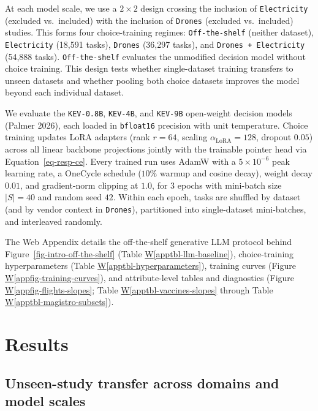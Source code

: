 \documentclass[
  11pt,
  letterpaper,
]{article}
\newcommand*\quartoapptblref[1]{Table \hyperref[#1]{W\ref{#1}}}
\newcommand*\quartoappfigref[1]{Figure \hyperref[#1]{W\ref{#1}}}
\begin{document}
At each model scale, we use a \(2 \times 2\) design crossing the
inclusion of \texttt{Electricity} (excluded vs.~included) with the
inclusion of \texttt{Drones} (excluded vs.~included) studies. This forms
four choice-training regimes: \texttt{Off-the-shelf} (neither dataset),
\texttt{Electricity} (18,591 tasks), \texttt{Drones} (36,297 tasks), and
\texttt{Drones\ +\ Electricity} (54,888 tasks). \texttt{Off-the-shelf}
evaluates the unmodified decision model without choice training. This
design tests whether single-dataset training transfers to unseen
datasets and whether pooling both choice datasets improves the model
beyond each individual dataset.

We evaluate the \texttt{KEV-0.8B}, \texttt{KEV-4B}, and \texttt{KEV-9B}
open-weight decision models (Palmer 2026), each loaded in
\texttt{bfloat16} precision with unit temperature. Choice training
updates LoRA adapters (rank \(r = 64\), scaling
\(\alpha_{\mathrm{LoRA}} = 128\), dropout \(0.05\)) across all linear
backbone projections jointly with the trainable pointer head via
Equation~\ref{eq-resp-ce}. Every trained run uses AdamW with a
\(5 \times 10^{-6}\) peak learning rate, a OneCycle schedule (\(10\%\)
warmup and cosine decay), weight decay \(0.01\), and gradient-norm
clipping at \(1.0\), for \(3\) epochs with mini-batch size \(|S| = 40\)
and random seed \(42\). Within each epoch, tasks are shuffled by dataset
(and by vendor context in \texttt{Drones}), partitioned into
single-dataset mini-batches, and interleaved randomly.

The Web Appendix details the off-the-shelf generative LLM protocol
behind Figure~\ref{fig-intro-off-the-shelf}
(\quartoapptblref{apptbl-llm-baseline}), choice-training hyperparameters
(\quartoapptblref{apptbl-hyperparameters}), training curves
(\quartoappfigref{appfig-training-curves}), and attribute-level tables
and diagnostics (\quartoappfigref{appfig-flights-slopes};
\quartoapptblref{apptbl-vaccines-slopes} through
\quartoapptblref{apptbl-magistro-subsets}).

\section{Results}\label{sec-results}

\subsection{Unseen-study transfer across domains and model
scales}\label{unseen-study-transfer-across-domains-and-model-scales}
\end{document}
